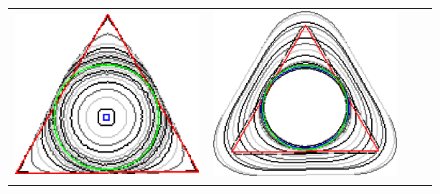 \begin{figure}
\begin{tabular}{cccc}
\includegraphics[scale=0.15]{figures/chapter9/free-elastica/balanceflow/triangle/len_pen-0.01/radius-7/summary.pdf} &
\includegraphics[scale=0.15]{figures/chapter9/free-elastica/graphflow/triangle/len_pen-0.01/radius-7/summary.pdf} \\[1em]

\end{tabular}
\end{figure}
